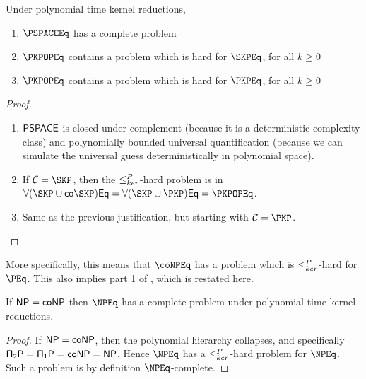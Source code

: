 \begin{corollary}
  Under polynomial time kernel reductions,
  \begin{enumerate}
  \item $\PSPACEEq$ has a complete problem
  \item $\PKPOPEq$ contains a problem which is hard for $\SKPEq$, for all $k\geq 0$
  \item $\PKPOPEq$ contains a problem which is hard for $\PKPEq$, for all $k\geq 0$
  \end{enumerate}
\end{corollary}
\begin{proof}\mbox{}
  \begin{enumerate}
  \item ${\mathsf{PSPACE}}$ is closed under complement (because it is a deterministic complexity class) and polynomially bounded universal quantification (because we can simulate the universal guess deterministically in polynomial space).
  \item If $\mathcal{C}=\SKP$, then the $\leq^{P}_{ker}$-hard problem is in $\forall(\SKP\cup\mathsf{co}\SKP)\mathsf{Eq}=\forall(\SKP\cup\PKP)\mathsf{Eq}=\PKPOPEq$.
  \item Same as the previous justification, but starting with $\mathcal{C}=\PKP$.\qedhere
  \end{enumerate}
\end{proof}

More specifically, this means that $\coNPEq$ has a problem which is $\leq^{P}_{ker}$-hard for $\PEq$.
This also implies part 1 of \cite[Theorem~8.7]{bcffm}, which is restated here.

\begin{corollary}
  If ${\mathsf{NP}}={\mathsf{coNP}}$ then $\NPEq$ has a complete problem under polynomial time kernel reductions.
\end{corollary}
\begin{proof}
  If ${\mathsf{NP}}={\mathsf{coNP}}$, then the polynomial hierarchy collapses, and specifically $\mathsf{\Pi_2P}=\mathsf{\Pi_1P}={\mathsf{coNP}}={\mathsf{NP}}$.
  Hence $\NPEq$ has a $\leq^{P}_{ker}$-hard problem for $\NPEq$.
  Such a problem is by definition $\NPEq$-complete.
\end{proof}

